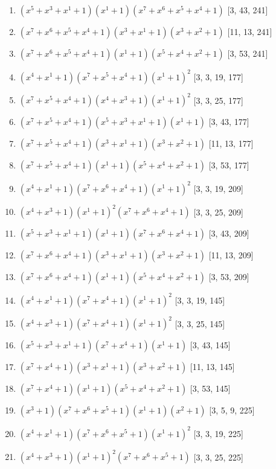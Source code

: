 \documentclass[10pt,twocolumn]{article}
\begin{document}
\begin{enumerate}
\item $(x^{5} + x^{3} + x^{1} + 1)(x^{1} + 1)(x^{7} + x^{6} + x^{5} + x^{4} + 1)$  [3, 43, 241]
\item $(x^{7} + x^{6} + x^{5} + x^{4} + 1)(x^{3} + x^{1} + 1)(x^{3} + x^{2} + 1)$  [11, 13, 241]
\item $(x^{7} + x^{6} + x^{5} + x^{4} + 1)(x^{1} + 1)(x^{5} + x^{4} + x^{2} + 1)$  [3, 53, 241]
\item $(x^{4} + x^{1} + 1)(x^{7} + x^{5} + x^{4} + 1)(x^{1} + 1)^{2}$  [3, 3, 19, 177]
\item $(x^{7} + x^{5} + x^{4} + 1)(x^{4} + x^{3} + 1)(x^{1} + 1)^{2}$  [3, 3, 25, 177]
\item $(x^{7} + x^{5} + x^{4} + 1)(x^{5} + x^{3} + x^{1} + 1)(x^{1} + 1)$  [3, 43, 177]
\item $(x^{7} + x^{5} + x^{4} + 1)(x^{3} + x^{1} + 1)(x^{3} + x^{2} + 1)$  [11, 13, 177]
\item $(x^{7} + x^{5} + x^{4} + 1)(x^{1} + 1)(x^{5} + x^{4} + x^{2} + 1)$  [3, 53, 177]
\item $(x^{4} + x^{1} + 1)(x^{7} + x^{6} + x^{4} + 1)(x^{1} + 1)^{2}$  [3, 3, 19, 209]
\item $(x^{4} + x^{3} + 1)(x^{1} + 1)^{2}(x^{7} + x^{6} + x^{4} + 1)$  [3, 3, 25, 209]
\item $(x^{5} + x^{3} + x^{1} + 1)(x^{1} + 1)(x^{7} + x^{6} + x^{4} + 1)$  [3, 43, 209]
\item $(x^{7} + x^{6} + x^{4} + 1)(x^{3} + x^{1} + 1)(x^{3} + x^{2} + 1)$  [11, 13, 209]
\item $(x^{7} + x^{6} + x^{4} + 1)(x^{1} + 1)(x^{5} + x^{4} + x^{2} + 1)$  [3, 53, 209]
\item $(x^{4} + x^{1} + 1)(x^{7} + x^{4} + 1)(x^{1} + 1)^{2}$  [3, 3, 19, 145]
\item $(x^{4} + x^{3} + 1)(x^{7} + x^{4} + 1)(x^{1} + 1)^{2}$  [3, 3, 25, 145]
\item $(x^{5} + x^{3} + x^{1} + 1)(x^{7} + x^{4} + 1)(x^{1} + 1)$  [3, 43, 145]
\item $(x^{7} + x^{4} + 1)(x^{3} + x^{1} + 1)(x^{3} + x^{2} + 1)$  [11, 13, 145]
\item $(x^{7} + x^{4} + 1)(x^{1} + 1)(x^{5} + x^{4} + x^{2} + 1)$  [3, 53, 145]
\item $(x^{3} + 1)(x^{7} + x^{6} + x^{5} + 1)(x^{1} + 1)(x^{2} + 1)$  [3, 5, 9, 225]
\item $(x^{4} + x^{1} + 1)(x^{7} + x^{6} + x^{5} + 1)(x^{1} + 1)^{2}$  [3, 3, 19, 225]
\item $(x^{4} + x^{3} + 1)(x^{1} + 1)^{2}(x^{7} + x^{6} + x^{5} + 1)$  [3, 3, 25, 225]

\end{enumerate}
\end{document}
